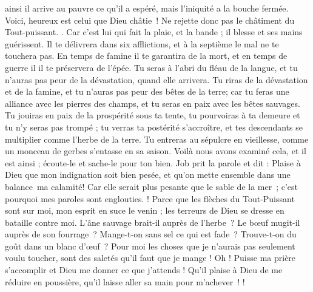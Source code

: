 \begin{multicols}{2}
ainsi il arrive au pauvre ce qu'il a espéré, mais l'iniquité a la bouche fermée.
Voici, heureux est celui que Dieu châtie ! Ne rejette donc pas le châtiment du Tout-puissant.
.
Car c'est lui qui fait la plaie, et la bande ; il blesse et ses mains guérissent.
Il te délivrera dans six afflictions, et à la septième le mal ne te touchera pas.
En temps de famine il te garantira de la mort, et en temps de guerre il il te préservera de l'épée.
Tu seras à l'abri du fléau de la langue, et tu n’auras pas peur de la dévastation, quand elle arrivera.
Tu riras de la dévastation et de la famine, et tu n'auras pas peur des bêtes de la terre;
car tu feras une alliance avec les pierres des champs, et tu seras en paix avec les bêtes sauvages.
Tu jouiras en paix de la prospérité sous ta tente, tu pourvoiras à ta demeure et tu n'y seras pas trompé ;
tu verras ta postérité s'accroître, et tes descendants se multiplier comme l'herbe de la terre.
Tu entreras au sépulcre en vieillesse, comme un monceau de gerbes s'entasse en sa saison.
Voilà nous avons examiné cela, et il est ainsi ; écoute-le et sache-le pour ton bien.
\VerseOne{}Job prit la parole et dit :
Plaise à Dieu que mon indignation soit bien pesée, et qu’on mette ensemble dans une balance ma calamité!
Car elle serait plus pesante que le sable de la mer ; c’est pourquoi mes paroles sont englouties.
 !
Parce que les flèches du Tout-Puissant sont sur moi, mon esprit en suce le venin ; les terreurs de Dieu se dresse en bataille contre moi.
L'âne sauvage brait-il auprès de l’herbe ? Le bœuf mugit-il auprès de son fourrage ?
Mange-t-on sans sel ce qui est fade ? Trouve-t-on du goût dans un blanc d’œuf ?
Pour moi les choses que je n'aurais pas seulement voulu toucher, sont des saletés qu'il faut que je mange !
Oh ! Puisse ma prière s'accomplir et Dieu me donner ce que j'attends !
Qu’il plaise à Dieu de me réduire en poussière, qu’il laisse aller sa main pour m’achever !
!

\end{multicols}
